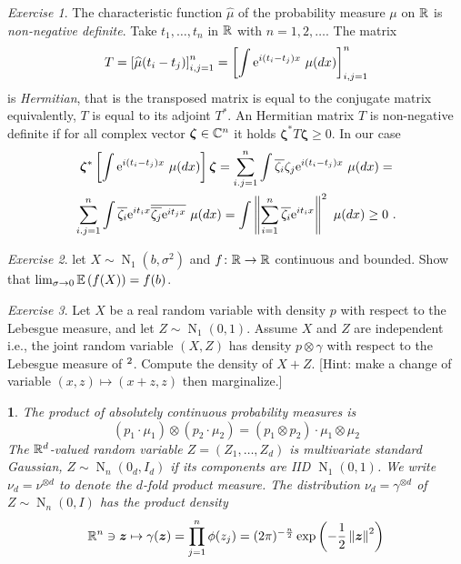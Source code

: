 \documentclass[12pt,a4paper]{amsart}
\newcommand{\bz}{\bm z}
\newcommand{\gaussian}[3]{\operatorname{N}_{#1}\left(#2,#3\right)}
\theoremstyle{plain}%
\newtheorem{npar}{}%
\theoremstyle{definition}
\theoremstyle{remark}
\newtheorem{exercise}{Exercise}
\begin{document}
\begin{exercise}
The characteristic function $\widehat \mu$ of the probability measure $\mu$ on $\mathbb{R}$ is \emph{non-negative definite}. Take $t_1,\dots,t_n$ in $\mathbb{R}$ with $n = 1,2,\dots$. The matrix
\begin{equation*}
  T = \left[ \widehat \mu(t_i - t_j) \right]_{i,j=1}^n = \left[ \int \euler^{i(t_i - t_j)x} \ \mu(dx)\right]_{i,j=1}^n 
\end{equation*}
is \emph{Hermitian}, that is the transposed matrix is equal to the conjugate matrix equivalently, $T$ is equal to its adjoint $T^*$. An Hermitian matrix $T$ is non-negative definite if for all complex vector $\bm \zeta \in \mathbb C^n$ it holds $\bm \zeta^* T \bm \zeta \geq 0$. In our case
\begin{multline*}
  \bm \zeta ^* \left[ \int \mathrm{e}^{i(t_i - t_j)x} \ \mu(dx)\right] \bm \zeta = \sum_{i.j=1}^n \int \overline{\zeta_i}\zeta_j \mathrm{e}^{i(t_i - t_j)x} \ \mu(dx) = \\ \sum_{i.j=1}^n \int \overline{\zeta_i}\mathrm{e}^{it_ix} \overline{\overline{\zeta_j}\mathrm{e}^{it_jx}}  \ \mu(dx) = \int \left\Vert\sum_{i=1}^n \overline{\zeta_i}\mathrm{e}^{it_ix}\right\Vert^2 \ \mu(dx) \geq 0 \ .
\end{multline*}
\end{exercise}

\begin{exercise}
let $X \sim \gaussian 1 b {\sigma^2}$ and $f \colon \mathbb{R} \to \mathbb{R}$ continuous and bounded. Show that $\lim_{\sigma \to 0} \operatorname{\mathbb E}\left(f(X)\right) = f(b)$.   
\end{exercise}

\begin{exercise}
  Let $X$ be a real random variable with density $p$ with respect to the Lebesgue measure, and let $Z \sim \gaussian 1 0 1$. Assume $X$ and $Z$ are independent i.e., the joint random variable $(X,Z)$ has density $p \otimes \gamma$ with respect to the Lebesgue measure of $\real^2$. Compute the density of $X+Z$. [Hint: make a change of variable $(x,z) \mapsto (x+z,z)$ then marginalize.]
\end{exercise}

\begin{npar} \normalfont
The product of absolutely continuous probability measures is
  \begin{equation*}
    (p_1 \cdot \mu_1)\otimes(p_2\cdot\mu_2) = (p_1\otimes p_2)\cdot \mu_1\otimes \mu_2
  \end{equation*}
  The $\mathbb{R}^d$-valued random variable $Z = (Z_1,\dots,Z_d)$ is multivariate \emph{standard Gaussian}, $Z \sim \gaussian n {0_d} {I_d}$ if its components are IID $\gaussian 1 0 1$. We write $\nu_d = \nu^{\otimes d}$ to denote the $d$-fold product measure.
The distribution $\nu_d = \gamma^{\otimes d}$ of $Z \sim \gaussian n 0 I$ has the product density
%
  \begin{equation*}
    \reals^n \ni \bz \mapsto \gamma(\bz) = \prod_{j=1}^n \phi(z_j) = (2\pi)^{-\frac{n}2} \expof{-\frac12 \normof{\bz}^2}
  \end{equation*}
\end{npar}
\end{document}

